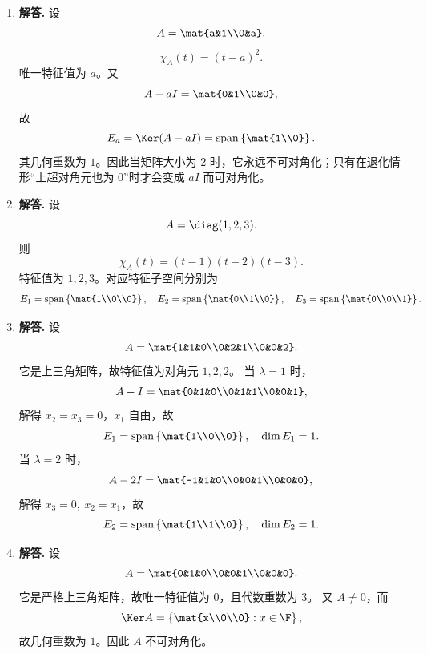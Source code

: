 \begin{enumerate}[label=\textbf{\arabic*.}, leftmargin=*, itemsep=1em]
\item \textbf{解答.} 设
\[
A=\mat{a&1\\0&a}.
\]
\[
\chi_A(t)=(t-a)^2.
\]
唯一特征值为 \(a\)。又
\[
A-aI=\mat{0&1\\0&0},
\]
故
\[
E_a=\Ker(A-aI)=\operatorname{span}\left\{\mat{1\\0}\right\}.
\]
其几何重数为 \(1\)。因此当矩阵大小为 \(2\) 时，它永远不可对角化；只有在退化情形“上超对角元也为 \(0\)”时才会变成 \(aI\) 而可对角化。

\item \textbf{解答.} 设
\[
A=\diag(1,2,3).
\]
则
\[
\chi_A(t)=(t-1)(t-2)(t-3).
\]
特征值为 \(1,2,3\)。对应特征子空间分别为
\[
E_1=\operatorname{span}\left\{\mat{1\\0\\0}\right\},\quad
E_2=\operatorname{span}\left\{\mat{0\\1\\0}\right\},\quad
E_3=\operatorname{span}\left\{\mat{0\\0\\1}\right\}.
\]

\item \textbf{解答.} 设
\[
A=\mat{1&1&0\\0&2&1\\0&0&2}.
\]
它是上三角矩阵，故特征值为对角元 \(1,2,2\)。  
当 \(\lambda=1\) 时，
\[
A-I=\mat{0&1&0\\0&1&1\\0&0&1},
\]
解得 \(x_2=x_3=0\)，\(x_1\) 自由，故
\[
E_1=\operatorname{span}\left\{\mat{1\\0\\0}\right\},\quad \dim E_1=1.
\]
当 \(\lambda=2\) 时，
\[
A-2I=\mat{-1&1&0\\0&0&1\\0&0&0},
\]
解得 \(x_3=0,\ x_2=x_1\)，故
\[
E_2=\operatorname{span}\left\{\mat{1\\1\\0}\right\},\quad \dim E_2=1.
\]

\item \textbf{解答.} 设
\[
A=\mat{0&1&0\\0&0&1\\0&0&0}.
\]
它是严格上三角矩阵，故唯一特征值为 \(0\)，且代数重数为 \(3\)。  
又 \(A\neq0\)，而
\[
\Ker A=\left\{\mat{x\\0\\0}:x\in\F\right\},
\]
故几何重数为 \(1\)。因此 \(A\) 不可对角化。


\end{enumerate}
